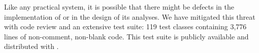 Like any practical system, it is possible that there might
be defects in the implementation of \tool or in the design of
its analyses. We have mitigated this threat with code review and an extensive
test suite:
119 test classes containing 3,776 lines of non-comment, non-blank code.
This test suite is publicly available and distributed with \tool.

